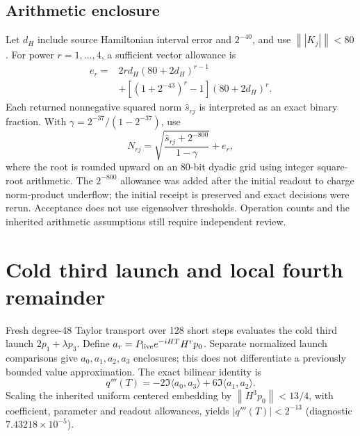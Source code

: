 \documentclass[a4paper,conference]{IEEEtran}
\newcommand{\norm}[1]{\left\|#1\right\|}
\begin{document}
\subsection{Arithmetic enclosure}
Let $d_H$ include source Hamiltonian interval error and $2^{-40}$, and use $\norm{|K_j|}<80$. For power $r=1,\ldots,4$, a sufficient vector allowance is
\begin{align}
e_r={}&2r d_H(80+2d_H)^{r-1}\\
&+[(1+2^{-43})^r-1](80+2d_H)^r.\nonumber
\end{align}
Each returned nonnegative squared norm $\widehat s_{rj}$ is interpreted as an exact binary fraction. With $\gamma=2^{-37}/(1-2^{-37})$, use
\begin{equation}
N_{rj}=\sqrt{\frac{\widehat s_{rj}+2^{-800}}{1-\gamma}}+e_r,
\end{equation}
where the root is rounded upward on an 80-bit dyadic grid using integer square-root arithmetic. The $2^{-800}$ allowance was added after the initial readout to charge norm-product underflow; the initial receipt is preserved and exact decisions were rerun. Acceptance does not use eigensolver thresholds. Operation counts and the inherited arithmetic assumptions still require independent review.

\section{Cold third launch and local fourth remainder}
Fresh degree-48 Taylor transport over 128 short steps evaluates the cold third launch $2p_1+\lambda p_3$. Define $a_r=P_{\rm live}e^{-iHT}H^rp_0$. Separate normalized launch comparisons give $a_0,a_1,a_2,a_3$ enclosures; this does not differentiate a previously bounded value approximation. The exact bilinear identity is
\begin{equation}
q'''(T)=-2\Im\langle a_0,a_3\rangle+6\Im\langle a_1,a_2\rangle.
\end{equation}
Scaling the inherited uniform centered embedding by $\norm{H^3p_0}<13/4$, with coefficient, parameter and readout allowances, yields $|q'''(T)|<2^{-13}$ (diagnostic $7.43218\times10^{-5}$).
\end{document}
